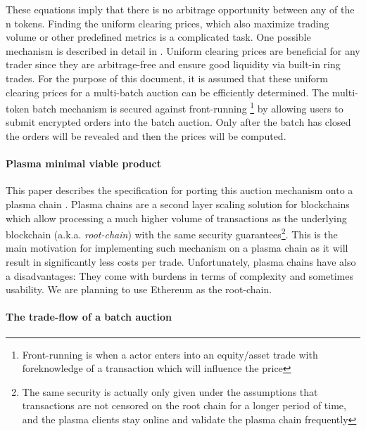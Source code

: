 \documentclass[11pt,parskip=full]{scrartcl}%
\begin{document}
These equations imply that there is no arbitrage opportunity between any of the n tokens.
Finding the uniform clearing prices, which also maximize trading volume or other predefined metrics is a complicated task. One possible mechanism is described in detail in \cite{priceOptimization}. Uniform clearing prices are beneficial for any trader since they are arbitrage-free and ensure good liquidity via built-in ring trades. For the purpose of this document, it is assumed that these uniform clearing prices for a multi-batch auction can be efficiently determined. \newline
The multi-token batch mechanism is secured against front-running \footnote{Front-running is when a actor enters into an equity/asset trade with foreknowledge of a transaction which will influence the price} by allowing users to submit encrypted orders into the batch auction. Only after the batch has closed the orders will be revealed and then the prices will be computed. 


\paragraph{Plasma minimal viable product}

This paper describes the specification for porting this auction mechanism onto a plasma chain \cite{plasma}. Plasma chains are a second layer scaling solution for blockchains which allow processing a much higher volume of transactions as the underlying blockchain (a.k.a. \emph{root-chain}) with the same security guarantees\footnote{The same security is actually only given under the assumptions that transactions are not censored on the root chain for a longer period of time, and the plasma clients stay online and validate the plasma chain frequently}. This is the main motivation for implementing such mechanism on a plasma chain as it will result in significantly less costs per trade. Unfortunately, plasma chains have also a disadvantages: They come with burdens in terms of complexity and sometimes usability. We are planning to use Ethereum as the root-chain. 

\paragraph{The trade-flow of a batch auction}  
\end{document}
